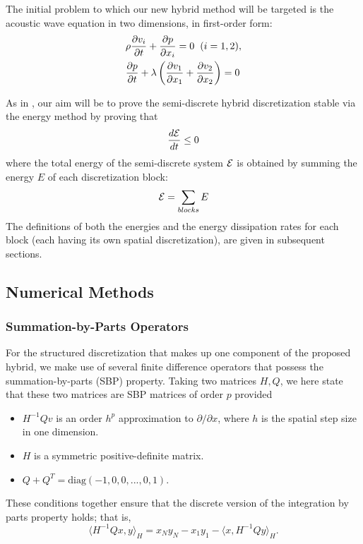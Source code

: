 The initial problem to which our new hybrid method will be targeted is
the acoustic wave equation in two dimensions, in first-order form:
\begin{align}
	&\rho \frac{\partial v_{i}}{\partial t} + \frac{\partial p}{\partial x_{i}} = 0 \hspace{2mm} (i = 1, 2), \label{eq:wave1} \\
	&\frac{\partial p}{\partial t} + \lambda \left(\frac{\partial v_{1}}{\partial x_{1}} + \frac{\partial v_{2}}{\partial x_{2}} \right) = 0 \label{eq:wave2}
\end{align}

As in \cite{kozdon2016stable}, our aim will be to prove the semi-discrete hybrid discretization
stable via the energy method by proving that
\begin{align}
\frac{d\mathcal{E}}{dt} \leq 0
\end{align}
where the total energy of the semi-discrete system $\mathcal{E}$ is obtained by summing the
energy $E$ of each discretization block:
\begin{align}
\mathcal{E} = \sum_{blocks} E
\end{align}
The definitions of both the energies and the energy dissipation rates for each
block (each having its own spatial discretization), are given in subsequent
sections.

\subsection{Numerical Methods}

\subsubsection{Summation-by-Parts Operators}

For the structured discretization that makes up one component of the proposed hybrid, we make use of several
finite difference operators that possess the summation-by-parts (SBP) property. Taking two matrices
${H,Q}$, we here state that these two matrices are SBP matrices of order $p$ provided 
\begin{itemize}
\item $H^{-1}Q v$ is an order $h^{p}$ approximation to $\partial/\partial x$, where $h$ is the spatial step size in one dimension.
\item $H$ is a symmetric positive-definite matrix.
\item $Q + Q^{T} = \text{diag}(-1,0,0,...,0,1)$.
\end{itemize}
These conditions together ensure that the discrete version of the integration by parts property holds; that is,
\[\langle H^{-1}Q x , y\rangle_{H} = x_{N} y_{N} -  x_{1} y_{1} - \langle x,H^{-1}Q y\rangle _{H}. \]

